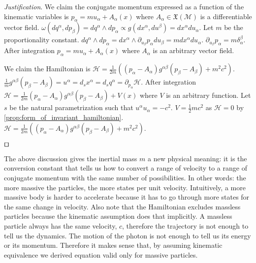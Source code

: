 \documentclass[smallextended]{svjour3}
\numberwithin{equation}{section}
\newenvironment{justification}{\emph{Justification}.}{\hfill\(\qed\)}
\begin{document}
\begin{justification}
	We claim the conjugate momentum expressed as a function of the kinematic variables is $p_\alpha = m u_\alpha + A_\alpha(x)$ where $A_\alpha \in \mathfrak{X}(\mathcal{M})$ is a differentiable vector field. $\omega(dq^\alpha, dp_\beta) = dq^\alpha \wedge dp_\alpha \propto g(dx^\alpha, du^\beta) = dx^\alpha du_\alpha$. Let $m$ be the proportionality constant. $dq^\alpha \wedge dp_\alpha = dx^\alpha \wedge \partial_{u_\beta} p_\alpha du_\beta = m dx^\alpha du_\alpha$. $\partial_{u_\beta} p_\alpha = m \delta_\alpha^\beta$. After integration $p_\alpha = m u_\alpha + A_\alpha(x)$ where $A_\alpha$ is an arbitrary vector field.
	
	We claim the Hamiltonian is $\mathcal{H}=\frac{1}{2m}((p_\alpha-A_\alpha)g^{\alpha\beta}(p_\beta-A_\beta) + m^2 c^2)$.  $\frac{1}{m}g^{\alpha\beta}(p_\beta-A_\beta) = u^\alpha = d_s x^\alpha = d_s q^\alpha = \partial_{p_\alpha} \mathcal{H}$. After integration $\mathcal{H}=\frac{1}{2m}(p_\alpha-A_\alpha)g^{\alpha\beta}(p_\beta-A_\beta)+V(x)$ where $V$ is an arbitrary function. Let $s$ be the natural parametrization such that $u^\alpha u_\alpha = - c^2$. $V= \frac{1}{2}m c^2$ as $\mathcal{H}=0$ by \ref{prop:form_of_invariant_hamiltonian}. $\mathcal{H}=\frac{1}{2m}((p_\alpha-A_\alpha)g^{\alpha\beta}(p_\beta-A_\beta) + m^2 c^2)$.
	
\end{justification}

The above discussion gives the inertial mass $m$ a new physical meaning: it is the conversion constant that tells us how to convert a range of velocity to a range of conjugate momentum with the same number of possibilities. In other words: the more massive the particles, the more states per unit velocity. Intuitively, a more massive body is harder to accelerate because it has to go through more states for the same change in velocity. Also note that the Hamiltonian excludes massless particles because the kinematic assumption does that implicitly. A massless particle always has the same velocity, $c$, therefore the trajectory is not enough to tell us the dynamics. The motion of the photon is not enough to tell us its energy or its momentum. Therefore it makes sense that, by assuming kinematic equivalence we derived equation valid only for massive particles.
\end{document}
